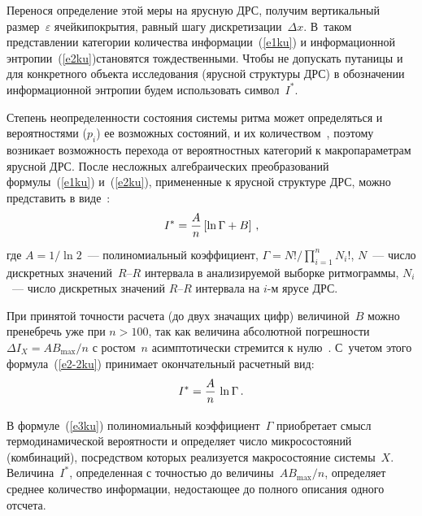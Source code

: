 \begin{multicols}{2}
  Перенося определение этой меры на ярусную ДРС, получим вертикальный 
размер~$\varepsilon$ ячейки\linebreak  покрытия, равный шагу дискретизации~$\Delta x$. 
В~таком представлении категории количества ин\-формации~(\ref{e1ku}) и 
информационной энтропии~(\ref{e2ku})\linebreak становятся тождественными. Чтобы не 
допускать путаницы и для конкретного объекта исследования (ярусной 
структуры ДРС) в обозначении информационной энтропии будем использовать 
символ~$I^*$. 
  
  Степень неопределенности состояния системы ритма может определяться и 
вероятностями ($p_i$) ее возможных состояний, и их количеством~\cite{15ku}, 
поэтому возникает возможность перехода от вероятностных категорий к 
макропараметрам ярусной ДРС. После несложных алгебраических 
преобразований формулы~(\ref{e1ku}) и~(\ref{e2ku}), примененные к ярусной 
структуре ДРС, можно представить в виде~\cite{6ku}: 
  \begin{equation}
  I^*=\displaystyle\frac{\displaystyle A\mathstrut}{\displaystyle n\mathstrut}\left[ \ln \Gamma +B\right ]\,,
  \label{e2-2ku}
  \end{equation}
где $A=1/\ln 2$~--- полиномиальный коэффициент, $\Gamma 
=N!/\prod\limits_{i=1}^n N_i!$, $N$~--- число дискретных значений~$R$--$R$ 
интервала в анализируемой выборке ритмограммы, $N_i$~--- число дискретных 
значений $R$--$R$ интервала на $i$-м ярусе ДРС.

  При принятой точности расчета (до двух значащих цифр) величиной~$B$ 
можно пренебречь уже при $n > 100$, так как величина абсолютной 
погрешности $\Delta I_X=AB_{\max}/n$ с ростом~$n$ асимптотически 
стремится к нулю~\cite{6ku}. С~учетом этого формула~(\ref{e2-2ku}) 
принимает окончательный расчетный вид: 
  \begin{equation}
  I^*=\displaystyle\frac{\displaystyle A\mathstrut}{\displaystyle n\mathstrut}\,\ln\Gamma\,.
  \label{e3ku}
  \end{equation}
  
  В формуле~(\ref{e3ku}) полиномиальный коэффициент~$\Gamma$ 
приобретает смысл термодинамической ве\-ро\-ят\-ности и определяет число 
микросостояний (ком\-бинаций), посредством которых реализуется\linebreak 
макросостояние системы~$X$. Величина~$I^*$, определенная с точностью до 
величины~$AB_{\max}/n$, определяет среднее количество информации, 
недостающее до полного описания одного отсчета. 
  

\end{multicols}
